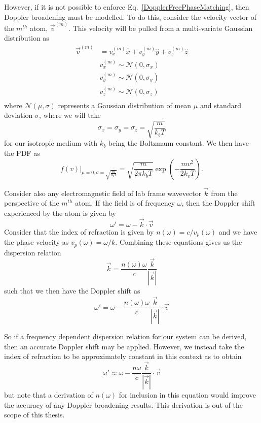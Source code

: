 \documentclass[aps,pra,showpacs,amsmath,amssymb,nofootinbib,longbibliography,superscriptaddress
]{revtex4-1}
\theoremstyle{definition}
\theoremstyle{remark}
\newcommand{\0}{\hat{0}}
\begin{document}
However, if it is not possible to enforce Eq.~\eqref{DopplerFreePhaseMatching}, then Doppler broadening must be modelled. To do this, consider the velocity vector of the $m^{th}$ atom, $\vec{v}^{(m)}$. This velocity will be pulled from a multi-variate Gaussian distribution as
\begin{align}
    \vec{v}^{(m)} &= v_x^{(m)} \hat{x} + v_y^{(m)} \hat{y} + v_z^{(m)} \hat{z}\\
    &v_x^{(m)} \sim \mathcal{N}(0, \sigma_x)\\
    &v_y^{(m)} \sim \mathcal{N}(0, \sigma_y)\\
    &v_z^{(m)} \sim \mathcal{N}(0, \sigma_z)\\
\end{align}
where $\mathcal{N}(\mu, \sigma)$ represents a Gaussian distribution of mean $\mu$ and standard deviation $\sigma$, where we will take 
\begin{equation}
\sigma_x = \sigma_y = \sigma_z = \sqrt{\frac{m}{k_b T}}
\end{equation}
for our isotropic medium with $k_b$ being the Boltzmann constant. We then have the PDF as
\begin{equation}\label{GaussianPDF}
f(v)\biggl|_{\mu=0, \sigma=\sqrt{\frac{m}{k_b T}}} = \sqrt{\frac{m}{2 \pi k_b T}}\exp{\left(-\frac{mv^2}{2 k_v T}\right)}.
\end{equation}

Consider also any electromagnetic field of lab frame wavevector $\vec{k}$ from the perspective of the $m^{th}$ atom. If the field is of frequency $\omega$, then the Doppler shift experienced by the atom is given by
\begin{equation}
    \omega' = \omega - \vec{k} \cdot \vec{v}
\end{equation}
Consider that the index of refraction is given by $n(\omega) = c / v_p(\omega)$ and we have the phase velocity as $v_p(\omega) = \omega / k$. Combining these equations gives us the dispersion relation
\begin{equation}
    \vec{k} = \frac{n(\omega) \omega}{c} \frac{\vec{k}}{|\vec{k}|}
\end{equation}
such that we then have the Doppler shift as
\begin{equation}\label{TrueDopplerShift}
    \omega' = \omega - \frac{n(\omega) \omega}{c} \frac{\vec{k}}{|\vec{k}|}\cdot \vec{v}
\end{equation}

So if a frequency dependent dispersion relation for our system can be derived, then an accurate Doppler shift may be applied. However, we instead take the index of refraction to be approximately constant in this context as to obtain
\begin{equation}\label{ApproxDopplerShift}
    \omega' \approx \omega - \frac{n \omega}{c} \frac{\vec{k}}{|\vec{k}|}\cdot \vec{v}
\end{equation}
but note that a derivation of $n(\omega)$ for inclusion in this equation would improve the accuracy of any Doppler broadening results. This derivation is out of the scope of this thesis.
\end{document}
